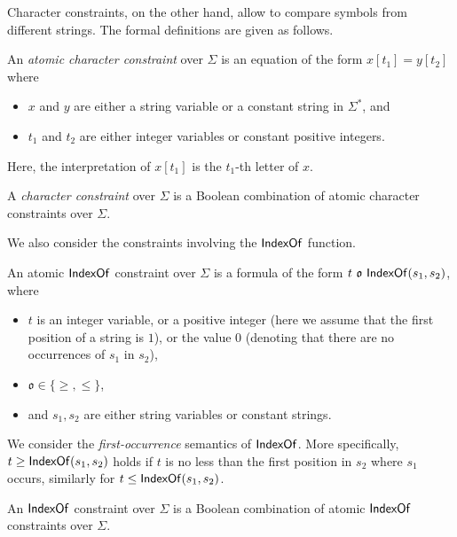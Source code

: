 Character constraints, on the other hand, allow to compare symbols from different strings. The formal definitions are given as follows. 

\begin{definition}
	An \emph{atomic character constraint} over $\Sigma$ is an equation of the form $x[t_1]=y[t_2]$ where 
	\begin{itemize}
		\item $x$ and $y$ are either a string variable or a constant string in $\Sigma^*$, and 
		\item $t_1$ and $t_2$ are either integer variables or constant positive integers.
	\end{itemize} 
Here, the interpretation of $x[t_1]$ is the $t_1$-th letter of $x$.	
	
A \emph{character constraint} over $\Sigma$ is a Boolean combination of atomic character constraints over $\Sigma$. 
\end{definition}

We also consider the constraints involving the $\mathsf{IndexOf}$ function.

\begin{definition}
An atomic $\mathsf{IndexOf}$ constraint over $\Sigma$ is a formula of the form $t\ \mathfrak{o}\ \indexof(s_1, s_2)$, where 
\begin{itemize}
\item $t$ is an integer variable, or a positive integer (here we assume that the first position of a string is $1$), or the value $0$ (denoting that there are no occurrences of $s_1$ in $s_2$), 
\item $\mathfrak{o} \in \{\ge, \le\}$, 
%
\item and $s_1,s_2$ are either string variables or constant strings. 
\end{itemize}
We consider the \emph{first-occurrence} semantics of $\mathsf{IndexOf}$.  More specifically, $t \ge \mathsf{IndexOf}(s_1, s_2)$ holds if $t$ is no less than the first position in $s_2$ where $s_1$ occurs, similarly for $t \le \mathsf{IndexOf}(s_1, s_2)$.

An $\mathsf{IndexOf}$ constraint over $\Sigma$ is a Boolean combination of atomic $\mathsf{IndexOf}$ constraints over $\Sigma$.
\end{definition}

%	


